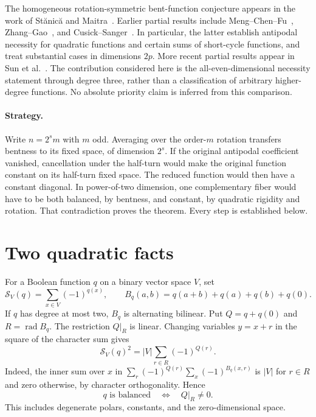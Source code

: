 \documentclass[11pt,a4paper]{article}
\newcommand{\Sgn}{\mathcal S}
\newcommand{\rad}{\operatorname{rad}}
\begin{document}
The homogeneous rotation-symmetric bent-function conjecture appears in the work of St\u{a}nic\u{a} and Maitra~\cite{stanica}. Earlier partial results include Meng--Chen--Fu~\cite{meng}, Zhang--Gao~\cite{zhang}, and Cusick--Sanger~\cite{cusick}. In particular, the latter establish antipodal necessity for quadratic functions and certain sums of short-cycle functions, and treat substantial cases in dimensions $2p$. More recent partial results appear in Sun et al.~\cite{sun}. The contribution considered here is the all-even-dimensional necessity statement through degree three, rather than a classification of arbitrary higher-degree functions. No absolute priority claim is inferred from this comparison.

\paragraph{Strategy.}
Write $n=2^s m$ with $m$ odd. Averaging over the order-$m$ rotation transfers bentness to its fixed space, of dimension $2^s$. If the original antipodal coefficient vanished, cancellation under the half-turn would make the original function constant on its half-turn fixed space. The reduced function would then have a constant diagonal. In power-of-two dimension, one complementary fiber would have to be both balanced, by bentness, and constant, by quadratic rigidity and rotation. That contradiction proves the theorem. Every step is established below.

\section{Two quadratic facts}
For a Boolean function $q$ on a binary vector space $V$, set
\[
 \Sgn_V(q)=\sum_{x\in V}(-1)^{q(x)},\qquad
 B_q(a,b)=q(a+b)+q(a)+q(b)+q(0).
\]
If $q$ has degree at most two, $B_q$ is alternating bilinear. Put $Q=q+q(0)$ and $R=\rad B_q$. The restriction $Q|_R$ is linear. Changing variables $y=x+r$ in the square of the character sum gives
\begin{equation}\label{eq:gauss}
 \Sgn_V(q)^2
 =|V|\sum_{r\in R}(-1)^{Q(r)}.
\end{equation}
Indeed, the inner sum over $x$ in
$\sum_r(-1)^{Q(r)}\sum_x(-1)^{B_q(x,r)}$
is $|V|$ for $r\in R$ and zero otherwise, by character orthogonality. Hence
\begin{equation}\label{eq:balance}
 q\text{ is balanced}\quad\Longleftrightarrow\quad Q|_R\ne0.
\end{equation}
This includes degenerate polars, constants, and the zero-dimensional space.
\end{document}
